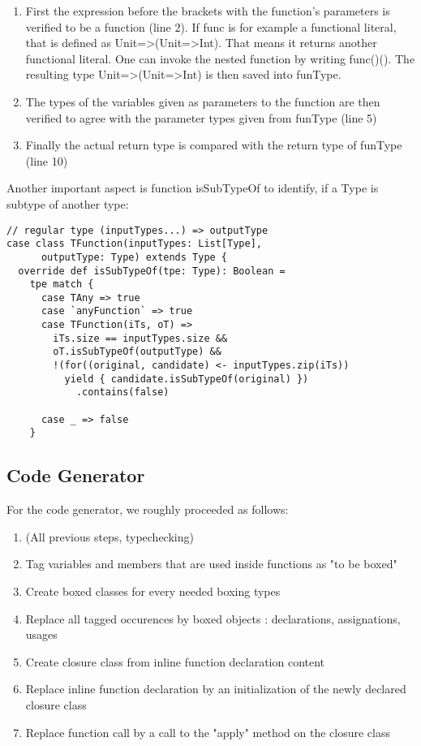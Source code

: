 \begin{enumerate}
\item First the expression before the brackets with the function's parameters is verified to be a function (line 2). If func is for example a functional literal, that is defined as Unit=\textgreater(Unit=\textgreater Int). That means it returns another functional literal. One can invoke the nested function by writing func()(). The resulting type Unit=\textgreater(Unit=\textgreater Int) is then saved into funType.
\item The types of the variables given as parameters to the function are then verified to agree with the parameter types given from funType (line 5)
\item Finally the actual return type is compared with the return type of funType (line 10)
\end{enumerate}


Another important aspect is function isSubTypeOf to identify, if a Type is subtype of another type:

\begin{lstlisting}
// regular type (inputTypes...) => outputType
case class TFunction(inputTypes: List[Type],
      outputType: Type) extends Type {
  override def isSubTypeOf(tpe: Type): Boolean =
    tpe match {
      case TAny => true
      case `anyFunction` => true
      case TFunction(iTs, oT) => 
        iTs.size == inputTypes.size && 
        oT.isSubTypeOf(outputType) && 
    	!(for((original, candidate) <- inputTypes.zip(iTs))
          yield { candidate.isSubTypeOf(original) })
            .contains(false)
    		  	
      case _ => false
    }
\end{lstlisting}

\subsection{Code Generator}
For the code generator, we roughly proceeded as follows:
\begin{enumerate}
\item (All previous steps, typechecking)
\item Tag variables and members that are used inside functions as "to be boxed"
\item Create boxed classes for every needed boxing types
\item Replace all tagged occurences by boxed objects : declarations, assignations, usages
\item Create closure class from inline function declaration content
\item Replace inline function declaration by an initialization of the newly declared closure class
\item Replace function call by a call to the "apply" method on the closure class
\end{enumerate}



